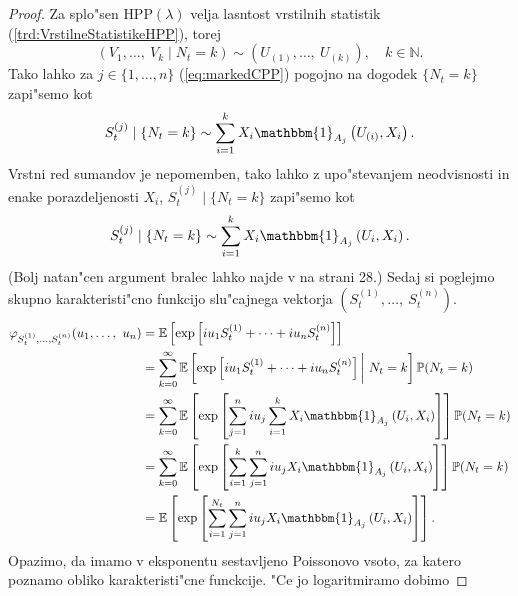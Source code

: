 \documentclass[12pt, a4paper, reqno]{amsart}
\theoremstyle{definition}
\theoremstyle{plain}
\newcommand{\N}{\mathbb{N}}
\newcommand{\E}{\mathbb{E}}
\newcommand{\Prob}{\mathbb{P}}
\newcommand{\1}{\mathds{1}}
\begin{document}
        \begin{proof}
            Za splo"sen $\text{HPP}(\lambda)$ velja lasntost vrstilnih statistik (\ref{trd:VrstilneStatistikeHPP}),
            torej
            \begin{equation*}
                \left(V_1, \dots, \ V_k \mid N_t = k\right)\sim \left(U_{(1)}, \dots, \ U_{(k)}\right), \quad k\in\N.
            \end{equation*}
            Tako lahko za $j\in\{1, \dots, n\}$ (\ref{eq:markedCPP}) pogojno na dogodek $\{N_t = k\}$ zapi"semo kot
            \begin{equation*}
                S_t^{(j)}\mid \{N_t = k\} \sim \sum_{i=1}^{k}X_i\mathbbm{1}_{A_j}\left(U_{(i)}, X_i\right).
            \end{equation*}
            Vrstni red sumandov je nepomemben, tako lahko z upo"stevanjem neodvisnosti in enake 
            porazdeljenosti $X_i$, $S_t^{(j)}\mid \{N_t = k\} $ zapi"semo kot 
            \begin{equation*}
                S_t^{(j)}\mid \{N_t = k\} \sim \sum_{i=1}^{k}X_i\mathbbm{1}_{A_j}\left(U_{i}, X_i\right).
            \end{equation*}
            (Bolj natan"cen argument bralec lahko najde v \cite{3} na strani 28.)
            Sedaj si poglejmo skupno karakteristi"cno funkcijo slu"cajnega vektorja
            $(S_t^{(1)}, \dots, \ S_t^{(n)})$.
            \begin{align*}
                \varphi_{S_t^{(1)},\dots, S_t^{(n)}}(u_1, \dots, \ u_n) 
                    &= \E\left[\exp\left[iu_1S_t^{(1)} + \dots + iu_nS_t^{(n)}\right]\right] \\
                    &= \sum_{k =0}^\infty \E\left[\exp\left[iu_1S_t^{(1)} + \dots + iu_nS_t^{(n)}\right]\bigg| \ N_t = k\right]\Prob(N_t = k)\\
                    &= \sum_{k=0}^\infty \E\left[\exp\left[\sum_{j=1}^niu_j\sum_{i=1}^kX_i\mathbbm{1}_{A_j}\left(U_i, X_i\right)\right]\right]\Prob(N_t = k)\\
                    &= \sum_{k=0}^\infty \E\left[\exp\left[\sum_{i=1}^k\sum_{j=1}^niu_jX_i\mathbbm{1}_{A_j}\left(U_i, X_i\right)\right]\right]\Prob(N_t = k)\\
                    &= \E\left[\exp\left[\sum_{i=1}^{N_t}\sum_{j=1}^niu_jX_i\mathbbm{1}_{A_j}\left(U_i, X_i\right)\right]\right]. 
            \end{align*}
            Opazimo, da imamo v eksponentu sestavljeno Poissonovo vsoto, za katero poznamo obliko karakteristi"cne 
            funckcije. "Ce jo logaritmiramo dobimo
            

\end{proof}
\end{document}
